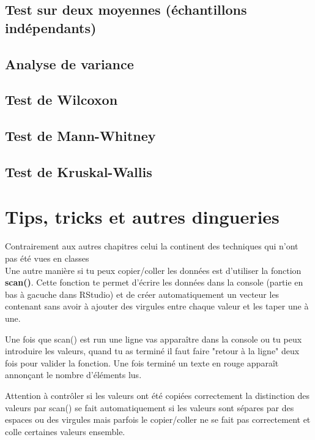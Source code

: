 \documentclass{report}
\begin{document}
\section{Test sur deux moyennes (échantillons indépendants)}

\section{Analyse de variance}

\section{Test de Wilcoxon}

\section{Test de Mann-Whitney}

\section{Test de Kruskal-Wallis}

\chapter{Tips, tricks et autres dingueries}

Contrairement aux autres chapitres celui la continent des techniques qui n'ont pas été vues en classes 
\\

Une autre manière si tu peux copier/coller les données est d'utiliser la fonction \textbf{scan()}. Cette fonction te permet d'écrire les données dans la console (partie en bas à gacuche dans RStudio) et de créer automatiquement un vecteur les contenant sans avoir à ajouter des virgules entre chaque valeur et les taper une à une. 

Une fois que scan() est run une ligne vas apparaître dans la console ou tu peux introduire les valeurs, quand tu as terminé il faut faire "retour à la ligne" deux fois pour valider la fonction. Une fois terminé un texte en rouge apparaît annonçant le nombre d'éléments lus.

Attention à contrôler si les valeurs ont été copiées correctement la distinction des valeurs par scan() se fait automatiquement si les valeurs sont sépares par des espaces ou des virgules mais parfois le copier/coller ne se fait pas correctement et colle certaines valeurs ensemble.
\end{document}
